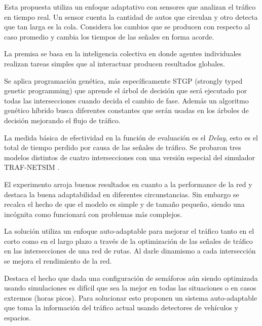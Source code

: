 \begin{itemize}
\begin{item}

Esta propuesta utiliza un enfoque adaptativo con sensores que analizan el tráfico en tiempo real. Un sensor cuenta la cantidad de autos que circulan y otro detecta que tan larga es la cola. Considera los cambios que se producen con respecto al caso promedio y cambia los tiempos de las señales en forma acorde.

La premisa se basa en la inteligencia colectiva en donde agentes individuales realizan tareas simples que al interactuar producen resultados globales.

Se aplica programación genética, más específicamente STGP (strongly typed genetic programming) \citep{Montana1995} que aprende el árbol de decisión que será ejecutado por todas las intersecciones cuando decida el cambio de fase. Además un algoritmo genético híbrido busca diferentes constantes que serán usadas en los árboles de decisión mejorando el flujo de tráfico.

La medida básica de efectividad en la función de evaluación es el \emph{Delay}, esto es el total de tiempo perdido por causa de las señales de tráfico. Se probaron tres modelos distintos de cuatro intersecciones con una versión especial del simulador TRAF-NETSIM \citep{TRAF-NETSIM}.

El experimento arroja buenos resultados en cuanto a la performance de la red y destaca la buena adaptabilidad en diferentes circunstancias. Sin embargo se recalca el hecho de que el modelo es simple y de tamaño pequeño, siendo una incógnita como funcionará con problemas más complejos.

\end{item}	


\begin{item}

La solución utiliza un enfoque auto-adaptable para mejorar el tráfico tanto en el corto como en el largo plazo a través de la optimización de las señales de tráfico en las intersecciones de una red de rutas. Al darle dinamismo a cada intersección se mejora el rendimiento de la red.

Destaca el hecho que dada una configuración de semáforos aún siendo optimizada usando simulaciones es difícil que sea la mejor en todas las situaciones o en casos extremos (horas picos). Para solucionar esto proponen un sistema auto-adaptable que toma la información del tráfico actual usando detectores de vehículos y espacios.


\end{item}
\end{itemize}
